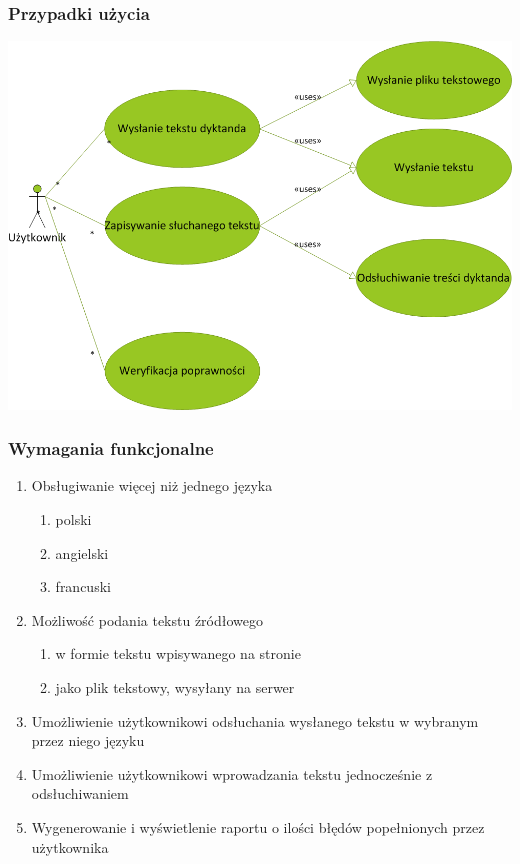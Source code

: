 \subsubsection {Przypadki użycia} 
\includegraphics[scale=0.55]{useCaseDictando.png} 
\subsubsection{Wymagania funkcjonalne}
\begin{enumerate}
	\item Obsługiwanie więcej niż jednego języka
		\begin{enumerate}
			\item polski
			\item angielski
			\item francuski
		\end{enumerate}
	\item Możliwość podania tekstu źródłowego
		\begin{enumerate}
			\item w formie tekstu wpisywanego na stronie
			\item jako plik tekstowy, wysyłany na serwer
		\end{enumerate}
	\item Umożliwienie użytkownikowi odsłuchania wysłanego tekstu w wybranym przez niego języku
	\item Umożliwienie użytkownikowi wprowadzania tekstu jednocześnie z odsłuchiwaniem
	\item Wygenerowanie i wyświetlenie raportu o ilości błędów popełnionych przez użytkownika
\end{enumerate}





